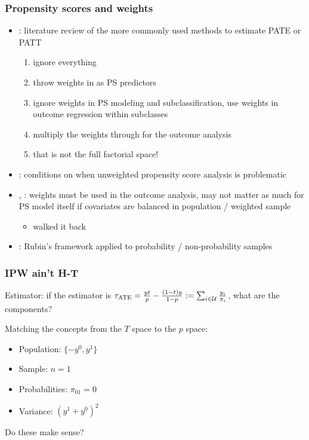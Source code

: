 \documentclass[aspectratio=43]{beamer}
\begin{document}
\begin{frame}\frametitle{Propensity scores and weights}

\begin{itemize}
	\item \citet{dong:stuart:lenis:nguyen:2020}: 
	      literature review of the more commonly used methods to estimate PATE or PATT
			\begin{enumerate}
				\item ignore everything
				\item throw weights in as PS predictors
			   \item ignore weights in PS modeling and subclassification, 
			          use weights in outcome regression within subclasses
			   \item multiply the weights through for the outcome analysis
			   \item that is not the full factorial space! 
			\end{enumerate}
	\item \citet{ridgeway:kovalchik:griffin:kabeto:2015}: 
	      conditions on when unweighted propensity score analysis is problematic
	\item \citet{lenis:nguyen:dong:stuart:2017},
			\citet{austin:jembere:chiu:2018}: weights must be used in the outcome analysis,
			may not matter as much for PS model itself if covariates are balanced in population
			/ weighted sample 
			\begin{itemize}
					\item \citet{dong:stuart:lenis:nguyen:2020} walked it back
			\end{itemize}
	\item \citet{mercer:kreuter:keeter:stuart:2017}: 
			Rubin's framework applied to probability / non-probability samples
\end{itemize}
\end{frame}

\begin{frame}\frametitle{IPW ain't H-T}

Estimator: if the estimator is $\tau_{\rm ATE}=\frac{yt}{p}-\frac{(1-t)y}{1-p} := \sum_{i \in \mathcal{U}} \frac{y_i}{\pi_i}$, 
what are the components?

Matching the concepts from the $T$ space to the $p$ space:

\begin{itemize}
    \item Population: $\{-y^0, y^1\}$
    \item Sample: $n=1$
    \item Probabilities: $\pi_{01}=0$
    \item Variance: $(y^1+y^0)^2$
\end{itemize}

Do these make sense? 

\end{frame}
\end{document}
